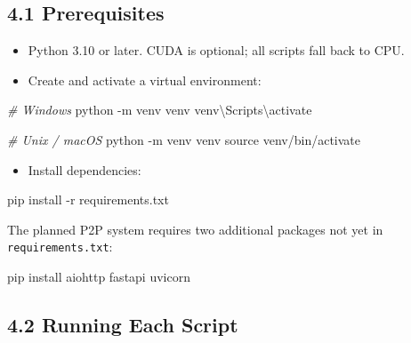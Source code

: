 \documentclass[11pt]{article}
\newenvironment{Shaded}{\small}{}
\newcommand{\AttributeTok}[1]{\textcolor[rgb]{0.49,0.56,0.16}{#1}}
\newcommand{\BuiltInTok}[1]{\textcolor[rgb]{0.00,0.50,0.00}{#1}}
\newcommand{\CommentTok}[1]{\textcolor[rgb]{0.38,0.63,0.69}{\textit{#1}}}
\newcommand{\ExtensionTok}[1]{#1}
\providecommand{\tightlist}{%
  \setlength{\itemsep}{0pt}\setlength{\parskip}{0pt}}
\begin{document}
\subsection{4.1 Prerequisites}

\begin{itemize}
\tightlist
\item Python 3.10 or later. CUDA is optional; all scripts fall back to CPU.
\item Create and activate a virtual environment:
\end{itemize}

\begin{Shaded}
\begin{Highlighting}[]
\CommentTok{\# Windows}
\ExtensionTok{python} \AttributeTok{-m} venv venv
\ExtensionTok{venv\textbackslash{}Scripts\textbackslash{}activate}

\CommentTok{\# Unix / macOS}
\ExtensionTok{python} \AttributeTok{-m} venv venv
\BuiltInTok{source} venv/bin/activate
\end{Highlighting}
\end{Shaded}

\begin{itemize}
\tightlist
\item Install dependencies:
\end{itemize}

\begin{Shaded}
\begin{Highlighting}[]
\ExtensionTok{pip} install \AttributeTok{-r} requirements.txt
\end{Highlighting}
\end{Shaded}

The planned P2P system requires two additional packages not yet in
\texttt{requirements.txt}:

\begin{Shaded}
\begin{Highlighting}[]
\ExtensionTok{pip} install aiohttp fastapi uvicorn
\end{Highlighting}
\end{Shaded}

\subsection{4.2 Running Each Script}
\end{document}
